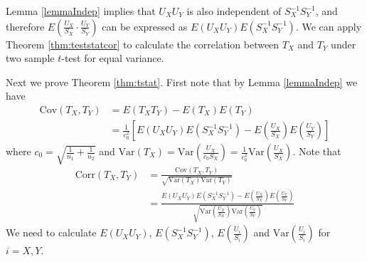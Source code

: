 \documentclass[review]{elsarticle}
\newcommand{\cov}{\text{Cov}}
\newcommand{\cor}{\text{Corr}}
\newcommand{\var}{\text{Var}}
\begin{document}
Lemma \ref{lemmaIndep} implies that  $U_XU_Y$ is also independent of $S_X^{-1}S_Y^{-1}$, and
therefore $E(\frac{U_X}{S_X} \cdot\frac{U_Y}{S_Y})$ can be expressed as
$E(U_XU_Y)E(S_X^{-1}S_Y^{-1})$. We can apply Theorem \ref{thm:teststatcor} to calculate the 
correlation between $T_X$ and $T_Y$ under two sample $t$-test for equal variance. 


Next we prove Theorem \ref{thm:tstat}. First note that by Lemma  \ref{lemmaIndep} we have
\begin{align*}
\cov(T_X, T_Y) &= E(T_XT_Y) - E(T_X)E(T_Y) \\
& = \frac{1}{c_0^2} \left[E(U_XU_Y)E(S_X^{-1}S_Y^{-1}) - E(\frac{U_X}{S_X})E( 
\frac{U_Y}{S_Y})\right]   
\end{align*}
where $c_0 = \sqrt{\frac{1}{n_1} + \frac{1}{n_2}}$ and $\var(T_X) = \var(\frac{U_X}{c_0S_X})=
\frac{1}{c_0^2}\var(\frac{U_X}{S_X})$. 
Note that 
\begin{equation}\label{eq:Tcorrelation}\tag{A.1}
\begin{aligned}
\cor(T_X, T_Y) & = \frac{\cov(T_X, T_Y) }{\sqrt{\var(T_X) \var(T_Y) }} \\
& = \frac{E(U_XU_Y)E(S_X^{-1}S_Y^{-1}) - E(\frac{U_X}{S_X})E(
	\frac{U_Y}{S_Y})}{\sqrt{\var(\frac{U_X}{S_X})\var(\frac{U_Y}{S_Y})}} 
\end{aligned}
\end{equation}
We need to calculate $E(U_XU_Y)$, $E(S_X^{-1}S_Y^{-1})$, $ E(\frac{U_i}{S_i})$ and
$\var(\frac{U_i}{S_i})$ for $i =X, Y$. 
\end{document}

